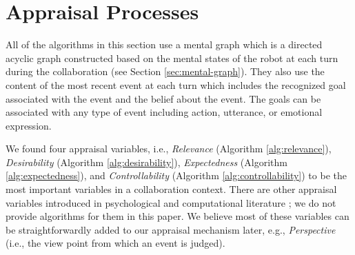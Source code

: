 \documentclass[letterpaper]{article}
\begin{document}
\begin{center}
\end{center}

\section{Appraisal Processes}
\label{sec:appraisal-process}

All of the algorithms in this section use a mental graph which is a directed
acyclic graph constructed based on the mental states of the robot at each turn
during the collaboration (see Section \ref{sec:mental-graph}). They also use the
content of the most recent event at each turn which includes the recognized goal
associated with the event and the belief about the event. The goals can be
associated with any type of event including action, utterance, or emotional
expression.

We found four appraisal variables, i.e., \textit{Relevance} (Algorithm
\ref{alg:relevance}), \textit{Desirability} (Algorithm \ref{alg:desirability}),
\textit{Expectedness} (Algorithm \ref{alg:expectedness}), and
\textit{Controllability} (Algorithm \ref{alg:controllability}) to be the most
important variables in a collaboration context. There are other appraisal
variables introduced in psychological \cite{scherer:appraisal-processes} and
computational literature \cite{gratch:domain-independent}; we do not provide
algorithms for them in this paper. We believe most of these variables can be
straightforwardly added to our appraisal mechanism later, e.g.,
\textit{Perspective} (i.e., the view point from which an event is judged).
\end{document}
